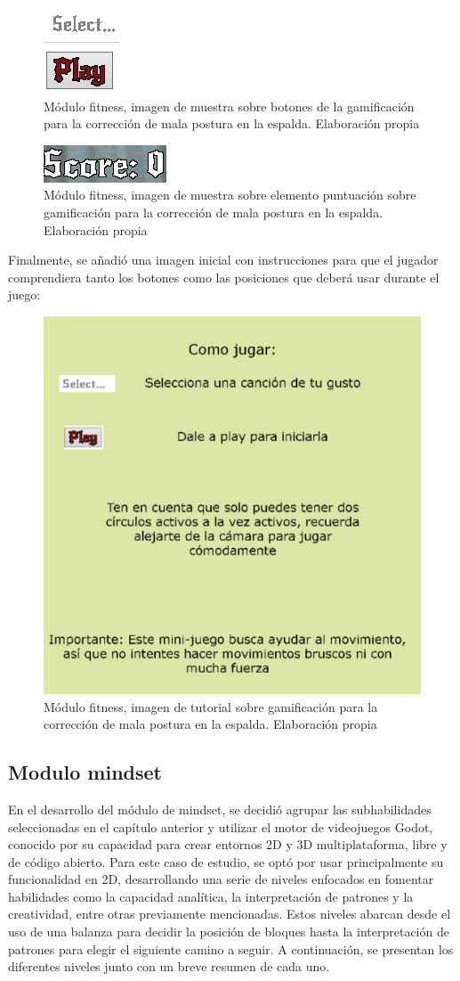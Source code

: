 \begin{figure}[H]
  \centering
  \includegraphics[width=0.1\linewidth]{Imagenes/Fitness4.png}
  \caption{Módulo fitness, imagen de muestra sobre botones de la gamificación para la corrección de mala postura en la espalda. Elaboración propia}
  \label{fig:imagen5fitness}
\end{figure}

\begin{figure}[H]
  \centering
  \includegraphics[width=0.2\linewidth]{Imagenes/Fitness5.png}
  \caption{Módulo fitness, imagen de muestra sobre elemento puntuación sobre gamificación para la corrección de mala postura en la espalda. Elaboración propia}
  \label{fig:imagen6fitness}
\end{figure}

Finalmente, se añadió una imagen inicial con instrucciones para que el jugador comprendiera tanto los botones como las posiciones que deberá usar durante el juego:
\begin{figure}[H]
  \centering
  \includegraphics[width=0.5\linewidth]{Imagenes/tuto-espalda.png}
  \caption{Módulo fitness, imagen de tutorial sobre gamificación para la corrección de mala postura en la espalda. Elaboración propia}
  \label{fig:imagen7fitness}
\end{figure}

\subsection{Modulo mindset}
En el desarrollo del módulo de mindset, se decidió agrupar las subhabilidades seleccionadas en el capítulo anterior y utilizar el motor de videojuegos Godot, conocido por su capacidad para crear entornos 2D y 3D multiplataforma, libre y de código abierto. Para este caso de estudio, se optó por usar principalmente su funcionalidad en 2D, desarrollando una serie de niveles enfocados en fomentar habilidades como la capacidad analítica, la interpretación de patrones y la creatividad, entre otras previamente mencionadas. Estos niveles abarcan desde el uso de una balanza para decidir la posición de bloques hasta la interpretación de patrones para elegir el siguiente camino a seguir. A continuación, se presentan los diferentes niveles junto con un breve resumen de cada uno.

